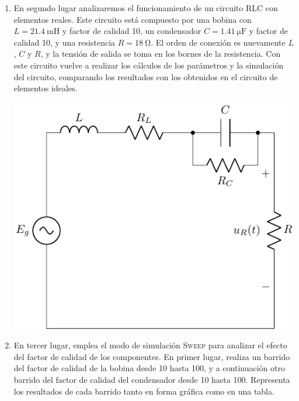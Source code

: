 \documentclass[a4paper,10pt]{article} %
\begin{document}
\begin{enumerate}
\item En segundo lugar analizaremos el funcionamiento de un circuito
  RLC con elementos reales. Este circuito está compuesto por una
  bobina con $L =\qty{21.4}{\milli\henry}$ y factor de calidad 10, un
  condensador $C=\qty{1.41}{\micro\farad}$ y factor de calidad 10, y
  una resistencia $R=\qty{18}{\ohm}$. El orden de conexión es
  nuevamente $L$, $C$ y $R$, y la tensión de salida se toma en los
  bornes de la resistencia. Con este circuito vuelve a realizar los
  cálculos de los parámetros y la simulación del circuito, comparando
  los resultados con los obtenidos en el circuito de elementos
  ideales.
  
  \begin{center}
    \includegraphics[height=0.2\textheight]{../figs/circuito_P4_2}
  \end{center}
	
\item En tercer lugar, emplea el modo de simulación \textsc{Sweep}
  para analizar el efecto del factor de calidad de los componentes. En
  primer lugar, realiza un barrido del factor de calidad de la bobina
  desde 10 hasta 100, y a continuación otro barrido del factor de
  calidad del condensador desde 10 hasta 100. Representa los
  resultados de cada barrido tanto en forma gráfica como en una tabla.
	


\end{enumerate}
\end{document}
